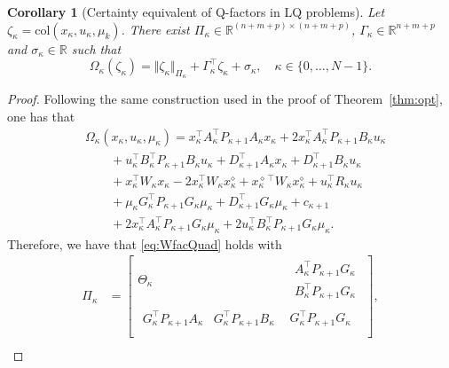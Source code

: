 \documentclass[10pt]{IEEEtran}      %
\newcommand{\R}{\mathbb{R}}
\newcommand{\col}{\mathrm{col}}
\theoremstyle{theorem}
\newtheorem{coro}{Corollary}
\theoremstyle{remark}
\begin{document}
\begin{coro}[Certainty equivalent of Q-factors in LQ problems]\label{cor:certEq}
Let $\zeta_\kappa=\col(x_\kappa, u_\kappa,\mu_k)$. There exist $\Pi_\kappa\in\R^{(n+m+p)\times (n+m+p)}$,
 $\Gamma_\kappa\in\R^{n+m+p}$ and $\sigma_\kappa\in\R$ such that
\begin{equation}\label{eq:WfacQuad}
\Omega_\kappa(\zeta_\kappa) = \Vert \zeta_\kappa \Vert_{\Pi_\kappa} + \Gamma_\kappa^\top \zeta_\kappa +\sigma_\kappa,\quad \kappa\in\{0,\dots,N-1\}.
\end{equation}
\end{coro}
\begin{proof}
Following the same construction used in the proof of Theorem~\ref{thm:opt}, one has that 
\begin{align}
\nonumber &\Omega_\kappa(x_\kappa,u_\kappa,\mu_\kappa) =  
x_\kappa^\top A_\kappa^\top P_{\kappa+1}  A_\kappa x_\kappa + 2  x_\kappa^\top A_\kappa^\top P_{\kappa+1}B_\kappa u_\kappa\\
\nonumber &\qquad+ u_\kappa^\top B_\kappa^\top P_{\kappa+1}B_\kappa u_\kappa+D_{\kappa+1}^\top A_\kappa x_\kappa+D_{\kappa+1}^\top B_\kappa u_\kappa\\
\nonumber&\qquad +x_\kappa^\top W_{\kappa} x_\kappa - 2  x_\kappa^\top W_\kappa x_\kappa^\diamond + x_\kappa^{\diamond\,\top} W_\kappa x_\kappa^{\diamond}
+u_\kappa^\top R_\kappa u_\kappa\\
\nonumber&\qquad +\mu_\kappa G_\kappa^\top P_{\kappa+1}G_\kappa\mu_\kappa+D_{\kappa+1}^\top G_\kappa \mu_\kappa+ c_{\kappa+1}\\
&\qquad + 2  x_\kappa^\top A_\kappa^\top P_{\kappa+1}G_\kappa \mu_\kappa + 2 u_\kappa^\top B_\kappa^\top P_{\kappa+1} G_\kappa\mu_\kappa.\label{eq:WW}
\end{align}
Therefore, we have that \eqref{eq:WfacQuad} holds with
\begin{align*}
\Pi_\kappa & = \left[\begin{array}{cc}
\Theta_\kappa  & 
\begin{array}{c}
A_\kappa^\top P_{\kappa+1}G_\kappa \\
B_\kappa^\top P_{\kappa+1}  G_\kappa
\end{array}
\\
\begin{array}{cc}
G_\kappa^\top P_{\kappa+1} A_\kappa & G_\kappa^\top P_{\kappa+1} B_\kappa
\end{array} &  G_\kappa^\top P_{\kappa+1}G_\kappa \\
\end{array}\right],\\

\end{align*}
\end{proof}
\end{document}
